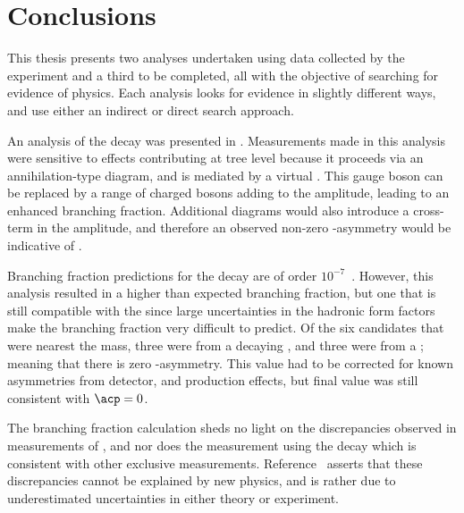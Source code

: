 \chapter{Conclusions}
\label{ch:conc}


This thesis presents two analyses undertaken using data collected by the \lhcb experiment
and a third to be completed, all
with the objective of searching for evidence of \bsm physics.
Each analysis looks for evidence in slightly different ways, and use either an indirect or direct
search approach.

An analysis of the decay \btodsphi was presented in .
Measurements made in this analysis were sensitive to \np effects contributing at tree
level because it proceeds via an annihilation-type diagram, and is mediated by a virtual \Wp.
This gauge boson can be replaced by a range of charged bosons adding to the amplitude, leading to
an enhanced branching fraction.
Additional \np diagrams would also introduce a cross-term in the amplitude, and therefore an
observed non-zero \CP-asymmetry would be indicative of \np.

Branching fraction predictions for the decay \btodsphi are of order
$10^{-7}$~\cite{Zou:2009zza,Mohanta:2002wf,PhysRevD.76.057701,Lu:2001yz}.
However, this analysis resulted in a higher than expected branching fraction, but one that is
still compatible with the \sm since large uncertainties in the hadronic form factors make the
branching fraction very difficult to predict.
Of the six candidates that were nearest the \Bp mass, three were from a decaying \Bp, and three
were from a \Bm; meaning that there is zero \CP-asymmetry.
This value had to be corrected for known asymmetries from detector, and production effects, but
final value was still consistent with $\acp=0$.

The branching fraction calculation sheds no light on the discrepancies observed in measurements of
, and nor does the  measurement using the decay  which is
consistent with other exclusive measurements.
Reference~\cite{Crivellin:2014zpa} asserts that these
discrepancies cannot be explained by new physics, and is rather due to underestimated uncertainties
in either theory or experiment.

